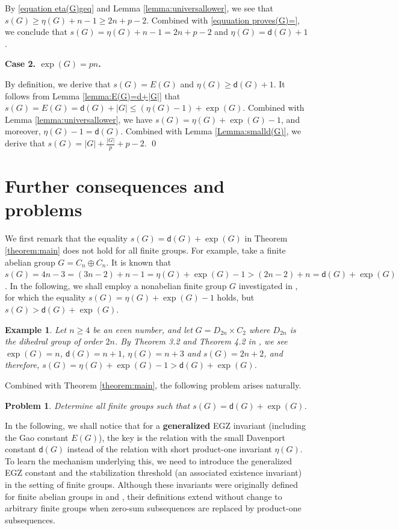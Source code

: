 \documentclass[a4paper, 12pt]{article}
\newtheorem{example}[theorem]{Example}
\newtheorem{problem}[theorem]{Problem}
\theoremstyle{definition}
\begin{document}
By \eqref{equation eta(G)geq} and Lemma \ref{lemma:universallower}, we see that $s(G)\geq\eta(G)+n-1\geq2n+p-2.$
Combined with \eqref{equuation proves(G)=}, we conclude that $s(G)=\eta(G)+n-1=2n+p-2$ and $\eta(G)=\mathsf d(G)+1$.

\medskip

\noindent \textbf{Case 2. $\exp(G)=pn$.}

By definition, we derive that
$s(G)=E(G)$ and $\eta(G)\geq \mathsf d(G)+1$. It follows from Lemma \ref{lemma:E(G)=d+|G|} that $s(G)=E(G)=\mathsf d(G)+|G|\leq (\eta(G)-1)+\exp(G)$. Combined with Lemma \ref{lemma:universallower}, we have $s(G)=\eta(G)+\exp(G)-1$, and moreover, $\eta(G)-1=\mathsf d(G)$. Combined with Lemma \ref{Lemma:smalld(G)}, we derive that
$s(G)=|G|+\frac{|G|}{p}+p-2$. \qed


\section{Further consequences and problems}


We first remark that the equality $s(G)=\mathsf d(G)+\exp(G)$ in Theorem \ref{theorem:main} does not hold for all finite groups. For example, take a finite abelian group $G=C_n\oplus C_n$. It is known that $s(G)=4n-3=(3n-2)+n-1=\eta(G)+\exp(G)-1>(2n-2)+n=\mathsf d(G)+\exp(G)$. In the following, we shall employ a nonabelian finite group $G$ investigated in  \cite{BLMR}, for which the equality $s(G)=\eta(G)+\exp(G)-1$ holds, but $s(G)>\mathsf d(G)+\exp(G)$.


\begin{example} Let $n\geq 4$ be an even number, and let $G=D_{2n}\times C_2$ where $D_{2n}$ is the dihedral group of order $2n$. By Theorem 3.2 and Theorem 4.2 in \cite{BLMR}, we see $\exp(G)=n$, $\mathsf d(G)=n+1$, $\eta(G)=n+3$ and $s(G)=2n+2$, and therefore, $s(G)=\eta(G)+\exp(G)-1>\mathsf d(G)+\exp(G)$.
\end{example}

Combined with Theorem \ref{theorem:main}, the following problem arises naturally.


\begin{problem}\label{problem1}  Determine all finite groups such that $s(G)=\mathsf d(G)+\exp(G)$.
\end{problem}

In the following, we shall notice that for a {\bf generalized} EGZ invariant (including the Gao constant $E(G)$), the key is the relation with the small Davenport constant $\mathsf d(G)$ instead of the relation with short product-one invariant  $\eta(G)$.
To learn the mechanism underlying this, we need to introduce the generalized EGZ constant and the stabilization threshold (an associated existence invariant) in the setting of finite groups. Although these invariants were originally defined for finite
abelian groups in \cite[Definition 2.1]{GaoGeroldingersurvey} and \cite[Definition 3.5]{GaoRestrictedII}, their
definitions extend without change to arbitrary finite groups when zero-sum
subsequences are replaced by product-one subsequences.
\end{document}
